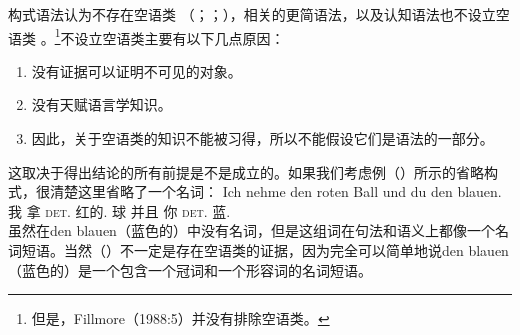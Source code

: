 构式语法认为不存在空语类\indexcxgc\label{Seite-leere-Elemente-CxG} （\citealp[--50]{MR2001a}；\citealp[]{Goldberg2003b}；\citealp[]{Goldberg2006a}），相关的更简语法\citep{CJ2005a}，以及认知语法也不设立空语类 。\footnote{%
  但是，Fillmore（1988:5）并没有排除空语类。
}不设立空语类主要有以下几点原因：
\begin{enumerate}
\item 没有证据可以证明不可见的对象。
\item 没有天赋语言学知识。
\item 因此，关于空语类的知识不能被习得，所以不能假设它们是语法的一部分。
\end{enumerate}
这取决于得出结论的所有前提是不是成立的。如果我们考虑例（）所示的省略构式，很清楚这里省略了一个名词：
\ea
\gll Ich nehme den roten Ball und du den blauen.\\
	 我 拿 \textsc{det}.\acc{} 红的.\acc{} 球 并且 你 \textsc{det}.\acc{} 蓝.\acc{}\\
\z
虽然在den blauen（蓝色的）中没有名词，但是这组词在句法和语义上都像一个名词短语。当然（）不一定是存在空语类的证据，因为完全可以简单地说den blauen（蓝色的）是一个包含一个冠词和一个形容词的名词短语\citep{Wunderlich87d}。

